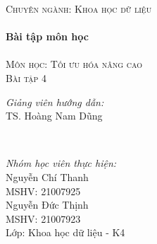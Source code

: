 \documentclass[14pt, a4paper]{article}
\theoremstyle{sltheorem}
\theoremstyle{soltheorem}
\begin{document}
\begin{titlepage}
        \textsc{\Large Chuyên ngành: Khoa học dữ liệu}\\[0.5cm] %



        \HRule \\[0.4cm]
        { \huge \bfseries Bài tập môn học}\\[0.4cm] %
        \HRule \\[1.5cm]

        \textsc{\Large Môn học: Tối ưu hóa nâng cao}\\[1.5cm] %


        \textsc{\Large Bài tập 4}\\[1.5cm]


        \begin{minipage}{0.4\textwidth}
            \begin{flushleft} \Large
            \emph{Giảng viên hướng dẫn:} \\
            TS. Hoàng Nam Dũng %
            \end{flushleft}
        \end{minipage}\\[1cm]

        \begin{minipage}{0.4\textwidth}
        \begin{flushleft} \Large
        \emph{Nhóm học viên thực hiện:}\\
        Nguyễn Chí Thanh \\
        MSHV: 21007925 \\ %
        Nguyễn Đức Thịnh \\
        MSHV: 21007923 \\
        Lớp: Khoa học dữ liệu - K4
        \end{flushleft}
        \end{minipage}




\end{titlepage}
\end{document}
